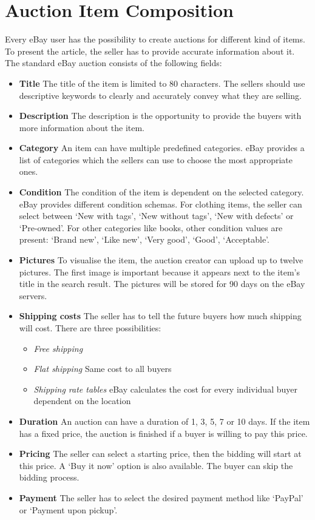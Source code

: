 \section{Auction Item Composition}
Every eBay user has the possibility to create auctions for different kind of items. To present the article, the seller has to provide accurate information about it. The standard eBay auction consists of the following fields:
\begin{itemize}
	\item \textbf{Title} The title of the item is limited to 80 characters. The sellers should use descriptive keywords to clearly and accurately convey what they are selling.
	\item \textbf{Description} The description is the opportunity to provide the buyers with more information about the item.
	\item \textbf{Category} An item can have multiple predefined categories. eBay provides a list of categories which the sellers can use to choose the most appropriate ones.
	\item \textbf{Condition} The condition of the item is dependent on the selected category. eBay provides different condition schemas. For clothing items, the seller can select between `New with tags', `New without tags', `New with defects' or `Pre-owned'. For other categories like books, other condition values are present: `Brand new', `Like new', `Very good', `Good', `Acceptable'.
	\item \textbf{Pictures} To visualise the item, the auction creator can upload up to twelve pictures. The first image is important because it appears next to the item's title in the search result. The pictures will be stored for 90 days on the eBay servers.
	\item \textbf{Shipping costs} The seller has to tell the future buyers how much shipping will cost. There are three possibilities:
	\begin{itemize}
		\item \textit{Free shipping}
		\item \textit{Flat shipping} Same cost to all buyers
		\item \textit{Shipping rate tables} eBay calculates the cost for every individual buyer dependent on the location
	\end{itemize}
	\item \textbf{Duration} An auction can have a duration of 1, 3, 5, 7 or 10 days. If the item has a fixed price, the auction is finished if a buyer is willing to pay this price.
	\item \textbf{Pricing} The seller can select a starting price, then the bidding will start at this price. A `Buy it now' option is also available. The buyer can skip the bidding process.
	\item \textbf{Payment} The seller has to select the desired payment method like `PayPal' or `Payment upon pickup'.
\end{itemize}

